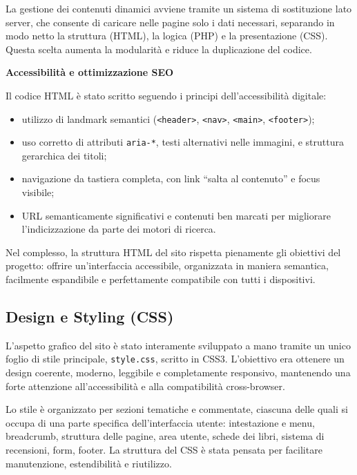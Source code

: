 \documentclass{article}
\begin{document}
\medskip

La gestione dei contenuti dinamici avviene tramite un sistema di sostituzione lato server, che consente di caricare nelle pagine solo i dati necessari, separando in modo netto la struttura (HTML), la logica (PHP) e la presentazione (CSS). Questa scelta aumenta la modularità e riduce la duplicazione del codice.

\bigskip

\noindent
\textbf{Accessibilità e ottimizzazione SEO}

Il codice HTML è stato scritto seguendo i principi dell’accessibilità digitale:

\begin{itemize}
  \item utilizzo di landmark semantici (\texttt{<header>}, \texttt{<nav>}, \texttt{<main>}, \texttt{<footer>});
  \item uso corretto di attributi \texttt{aria-*}, testi alternativi nelle immagini, e struttura gerarchica dei titoli;
  \item navigazione da tastiera completa, con link “salta al contenuto” e focus visibile;
  \item URL semanticamente significativi e contenuti ben marcati per migliorare l’indicizzazione da parte dei motori di ricerca.
\end{itemize}

\noindent
Nel complesso, la struttura HTML del sito rispetta pienamente gli obiettivi del progetto: offrire un’interfaccia accessibile, organizzata in maniera semantica, facilmente espandibile e perfettamente compatibile con tutti i dispositivi.


\subsection{Design e Styling (CSS)}

L’aspetto grafico del sito è stato interamente sviluppato a mano tramite un unico foglio di stile principale, \texttt{style.css}, scritto in CSS3. L’obiettivo era ottenere un design coerente, moderno, leggibile e completamente responsivo, mantenendo una forte attenzione all’accessibilità e alla compatibilità cross-browser.

Lo stile è organizzato per sezioni tematiche e commentate, ciascuna delle quali si occupa di una parte specifica dell’interfaccia utente: intestazione e menu, breadcrumb, struttura delle pagine, area utente, schede dei libri, sistema di recensioni, form, footer. La struttura del CSS è stata pensata per facilitare manutenzione, estendibilità e riutilizzo.
\end{document}
